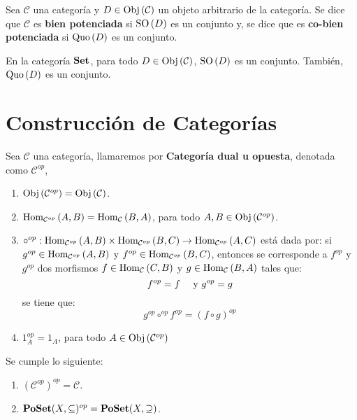 \documentclass[12pt]{report}
\theoremstyle{largebreak}
\newcommand\cf[3]{\ensuremath{#1:#2\rightarrow#3}}
\newcommand{\Obj}[1]{\ensuremath{\textup{Obj}\left(#1\right)}}
\newcommand{\Hom}[3]{\ensuremath{\textup{Hom}_{#1}\left(#2,#3\right)}}
\newcommand{\Cat}[1]{\ensuremath{\textup{\textbf{#1}}}}
\newcommand{\SO}[1]{\ensuremath{\textup{SO}\left(#1\right)}}
\newcommand{\Quo}[1]{\ensuremath{\textup{Quo}\left(#1 \right)}}
\begin{document}
    \begin{mydef}
        Sea $\mathcal{C}$ una categoría y $D\in\Obj{\mathcal{C}}$ un objeto arbitrario de la categoría. Se dice que $\mathcal{C}$ es \textbf{bien potenciada} si $\SO{D}$ es un conjunto y, se dice que es \textbf{co-bien potenciada} si $\Quo{D}$ es un conjunto.
    \end{mydef}

    \begin{exa}
        En la categoría $\Cat{Set}$, para todo $D\in\Obj{\mathcal{C}}$, $\SO{D}$ es un conjunto. También, $\Quo{D}$ es un conjunto.
    \end{exa}

    \section{Construcción de Categorías}

    \begin{mydef}
        Sea $\mathcal{C}$ una categoría, llamaremos por \textbf{Categoría dual u opuesta}, denotada como $\mathcal{C}^{op}$,
        \begin{enumerate}
            \item $\Obj{\mathcal{C}^{op}}=\Obj{\mathcal{C}}$.
            \item $\Hom{\mathcal{C}^{op}}{A}{B}=\Hom{\mathcal{C}}{B}{A}$, para todo $A,B\in\Obj{\mathcal{C}^{op}}$.
            \item $\cf{\circ^{op}}{\Hom{\mathcal{C}^{op}}{A}{B}\times \Hom{\mathcal{C}^{op}}{B}{C}}{\Hom{\mathcal{C}^{op}}{A}{C}}$ está dada por: si $g^{op}\in\Hom{\mathcal{C}^{op}}{A}{B}$ y $f^{op}\in\Hom{\mathcal{C}^{op}}{B}{C}$, entonces se corresponde a $f^{op}$ y $g^{op}$ dos morfismos $f\in\Hom{\mathcal{C}}{C}{B}$ y $g\in\Hom{\mathcal{C}}{B}{A}$ tales que:
            \begin{equation*}
                f^{op}=f\quad\textup{ y }g^{op}=g
            \end{equation*}
            se tiene que:
            \begin{equation*}
                g^{op}\circ^{op} f^{op}=(f\circ g)^{op}
            \end{equation*}
            \item $1_A^{op}=1_A$, para todo $A\in\Obj{\mathcal{C}^{op}}$
        \end{enumerate}
    \end{mydef}

    \begin{exa}
        Se cumple lo siguiente:
        \begin{enumerate}
            \item $(\mathcal{C}^{op})^{op}=\mathcal{C}$.
            \item $\Cat{PoSet}(X,\subseteq)^{op}=\Cat{PoSet}(X,\supseteq)$.
        \end{enumerate}
    \end{exa}
\end{document}
